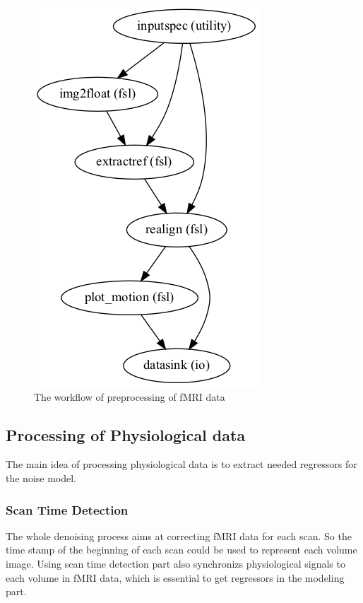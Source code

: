 \begin{figure}[htp]
    \centering
    \includegraphics[width=0.7\columnwidth]{Figures/gragh.png}
    \caption{The workflow of preprocessing of fMRI data}
    \label{fig:graph}
\end{figure}

\subsection{Processing of Physiological data}
The main idea of processing physiological data is to extract needed regressors for the noise model.

\subsubsection{Scan Time Detection}
The whole denoising process aims at correcting fMRI data for each scan. 
So the time stamp of the beginning of each scan could be used to represent each volume image. 
Using scan time detection part also synchronizs physiological signals to each volume in fMRI data,
which is essential to get regressors in the modeling part.

